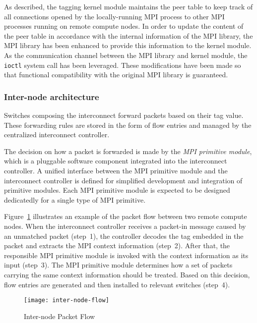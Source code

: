 As described, the tagging kernel module maintains the peer table to keep
track of all connections opened by the locally-running MPI process to
other MPI processes running on remote compute nodes. In order to
update the content of the peer table in accordance with the internal
information of the MPI library, the MPI library has been enhanced to
provide this information to the kernel module. As the communication
channel between the MPI library and kernel module, the
\lstinline!ioctl! system call has been leveraged. These
modifications have been made so that functional compatibility with the
original MPI library is guaranteed.

\subsubsection{Inter-node architecture}

Switches composing the interconnect forward packets based on their tag
value. These forwarding rules are stored in the form of flow entries and
managed by the centralized interconnect controller.

The decision on how a packet is forwarded is made by the \emph{MPI
primitive module}, which is a pluggable software component integrated
into the interconnect controller. A unified interface between the MPI
primitive module and the interconnect controller is defined for
simplified development and integration of primitive modules. Each MPI
primitive module is expected to be designed dedicatedly for a single
type of MPI primitive.

Figure~\ref{fig:inter-node-flow} illustrates an example of the packet
flow between two remote compute nodes. When the interconnect
controller receives a packet-in message caused by an unmatched packet
(step~1), the controller decodes the tag embedded in the packet and extracts
the MPI context information (step~2). After that, the responsible MPI
primitive module is invoked with the context information as its input
(step~3). The MPI primitive module determines how a set of packets carrying
the same context information should be treated. Based on this decision, flow
entries are generated and then installed to relevant switches (step~4).

\begin{figure}
    \centering
    \texttt{[image: inter-node-flow]}
    \caption{Inter-node Packet Flow}%
    \label{fig:inter-node-flow}
\end{figure}

